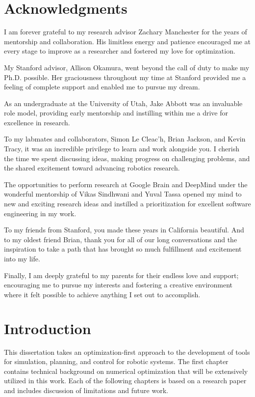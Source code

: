 \chapter*{Acknowledgments}
I am forever grateful to my research advisor Zachary Manchester for the years of mentorship and collaboration. His limitless energy and patience encouraged me at every stage to improve as a researcher and fostered my love for optimization.

My Stanford advisor, Allison Okamura, went beyond the call of duty to make my Ph.D. possible. Her graciousness throughout my time at Stanford provided me a feeling of complete support and enabled me to pursue my dream.

As an undergraduate at the University of Utah, Jake Abbott was an invaluable role model, providing early mentorship and instilling within me a drive for excellence in research.

To my labmates and collaborators, Simon Le Cleac'h, Brian Jackson, and Kevin Tracy, it was an incredible privilege to learn and work alongside you. I cherish the time we spent discussing ideas, making progress on challenging problems, and the shared excitement toward advancing robotics research.

The opportunities to perform research at Google Brain and DeepMind under the wonderful mentorship of Vikas Sindhwani and Yuval Tassa opened my mind to new and exciting research ideas and instilled a prioritization for excellent software engineering in my work. 

To my friends from Stanford, you made these years in California beautiful. And to my oldest friend Brian, thank you for all of our long conversations and the inspiration to take a path that has brought so much fulfillment and excitement into my life.

Finally, I am deeply grateful to my parents for their endless love and support; encouraging me to pursue my interests and fostering a creative environment where it felt possible to achieve anything I set out to accomplish. 

\chapter{Introduction}

This dissertation takes an optimization-first approach to the development of tools for simulation, planning, and control for robotic systems. The first chapter contains technical background on numerical optimization that will be extensively utilized in this work. Each of the following chapters is based on a research paper and includes discussion of limitations and future work.

